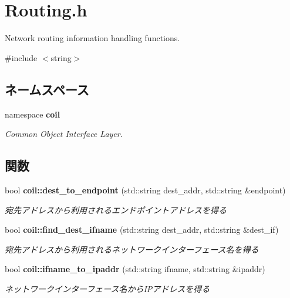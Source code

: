 \section{Routing.h}
\label{Routing_8h}


Network routing information handling functions.  


{\ttfamily \#include $<$string$>$}\par
\subsection*{ネームスペース}
\begin{DoxyCompactItemize}
\item 
namespace {\bf coil}


\begin{DoxyCompactList}\small\item\em Common Object Interface Layer. \item\end{DoxyCompactList}

\end{DoxyCompactItemize}
\subsection*{関数}
\begin{DoxyCompactItemize}
\item 
bool {\bf coil::dest\_\-to\_\-endpoint} (std::string dest\_\-addr, std::string \&endpoint)
\begin{DoxyCompactList}\small\item\em 宛先アドレスから利用されるエンドポイントアドレスを得る \item\end{DoxyCompactList}\item 
bool {\bf coil::find\_\-dest\_\-ifname} (std::string dest\_\-addr, std::string \&dest\_\-if)
\begin{DoxyCompactList}\small\item\em 宛先アドレスから利用されるネットワークインターフェース名を得る \item\end{DoxyCompactList}\item 
bool {\bf coil::ifname\_\-to\_\-ipaddr} (std::string ifname, std::string \&ipaddr)
\begin{DoxyCompactList}\small\item\em ネットワークインターフェース名からIPアドレスを得る \item\end{DoxyCompactList}\end{DoxyCompactItemize}


